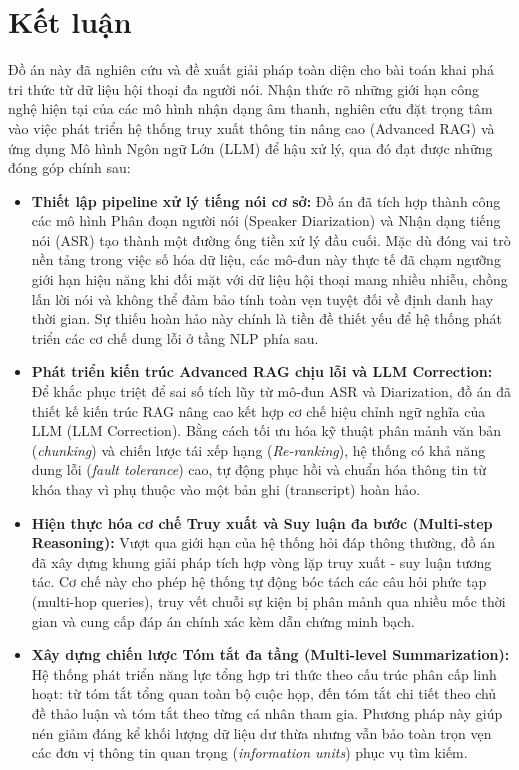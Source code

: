 \section{Kết luận}

Đồ án này đã nghiên cứu và đề xuất giải pháp toàn diện cho bài toán khai phá tri thức từ dữ liệu hội thoại đa người nói. Nhận thức rõ những giới hạn công nghệ hiện tại của các mô hình nhận dạng âm thanh, nghiên cứu đặt trọng tâm vào việc phát triển hệ thống truy xuất thông tin nâng cao (Advanced RAG) và ứng dụng Mô hình Ngôn ngữ Lớn (LLM) để hậu xử lý, qua đó đạt được những đóng góp chính sau:

\begin{itemize}[leftmargin=*, label={}]
    \item \textbf{Thiết lập pipeline xử lý tiếng nói cơ sở:} 
    Đồ án đã tích hợp thành công các mô hình Phân đoạn người nói (Speaker Diarization) và Nhận dạng tiếng nói (ASR) tạo thành một đường ống tiền xử lý đầu cuối. Mặc dù đóng vai trò nền tảng trong việc số hóa dữ liệu, các mô-đun này thực tế đã chạm ngưỡng giới hạn hiệu năng khi đối mặt với dữ liệu hội thoại mang nhiều nhiễu, chồng lấn lời nói và không thể đảm bảo tính toàn vẹn tuyệt đối về định danh hay thời gian. Sự thiếu hoàn hảo này chính là tiền đề thiết yếu để hệ thống phát triển các cơ chế dung lỗi ở tầng NLP phía sau.

    \item \textbf{Phát triển kiến trúc Advanced RAG chịu lỗi và LLM Correction:} 
    Để khắc phục triệt để sai số tích lũy từ mô-đun ASR và Diarization, đồ án đã thiết kế kiến trúc RAG nâng cao kết hợp cơ chế hiệu chỉnh ngữ nghĩa của LLM (LLM Correction). Bằng cách tối ưu hóa kỹ thuật phân mảnh văn bản (\textit{chunking}) và chiến lược tái xếp hạng (\textit{Re-ranking}), hệ thống có khả năng dung lỗi (\textit{fault tolerance}) cao, tự động phục hồi và chuẩn hóa thông tin từ khóa thay vì phụ thuộc vào một bản ghi (transcript) hoàn hảo.

    \item \textbf{Hiện thực hóa cơ chế Truy xuất và Suy luận đa bước (Multi-step Reasoning):} 
    Vượt qua giới hạn của hệ thống hỏi đáp thông thường, đồ án đã xây dựng khung giải pháp tích hợp vòng lặp truy xuất - suy luận tương tác. Cơ chế này cho phép hệ thống tự động bóc tách các câu hỏi phức tạp (multi-hop queries), truy vết chuỗi sự kiện bị phân mảnh qua nhiều mốc thời gian và cung cấp đáp án chính xác kèm dẫn chứng minh bạch.

    \item \textbf{Xây dựng chiến lược Tóm tắt đa tầng (Multi-level Summarization):} 
    Hệ thống phát triển năng lực tổng hợp tri thức theo cấu trúc phân cấp linh hoạt: từ tóm tắt tổng quan toàn bộ cuộc họp, đến tóm tắt chi tiết theo chủ đề thảo luận và tóm tắt theo từng cá nhân tham gia. Phương pháp này giúp nén giảm đáng kể khối lượng dữ liệu dư thừa nhưng vẫn bảo toàn trọn vẹn các đơn vị thông tin quan trọng (\textit{information units}) phục vụ tìm kiếm.


\end{itemize}
